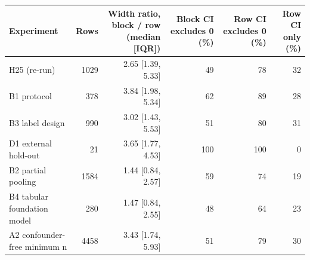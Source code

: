 \begin{tabular}{lrrrrr}
\toprule
Experiment & Rows & Width ratio, block / row (median [IQR]) & Block CI excludes 0 (\%) & Row CI excludes 0 (\%) & Row CI only (\%) \\
\midrule
H25 (re-run) & 1029 & 2.65 [1.39, 5.33] & 49 & 78 & 32 \\
B1 protocol & 378 & 3.84 [1.98, 5.34] & 62 & 89 & 28 \\
B3 label design & 990 & 3.02 [1.43, 5.53] & 51 & 80 & 31 \\
D1 external hold-out & 21 & 3.65 [1.77, 4.53] & 100 & 100 & 0 \\
B2 partial pooling & 1584 & 1.44 [0.84, 2.57] & 59 & 74 & 19 \\
B4 tabular foundation model & 280 & 1.47 [0.84, 2.55] & 48 & 64 & 23 \\
A2 confounder-free minimum n & 4458 & 3.43 [1.74, 5.93] & 51 & 79 & 30 \\
\bottomrule
\end{tabular}
